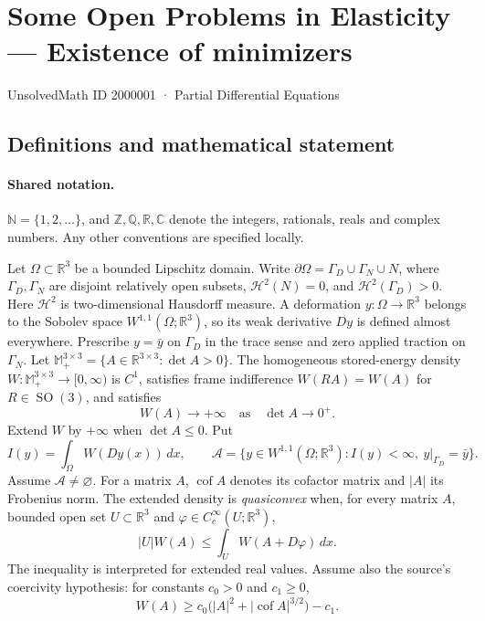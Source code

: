 \documentclass[11pt]{book}
\begin{document}
\setcounter{section}{2000000}
\section{Some Open Problems in Elasticity — Existence of minimizers}\label{2000001}
{\small\sffamily UnsolvedMath ID 2000001 · Partial Differential Equations}
\subsection{Definitions and mathematical statement}

\paragraph{Shared notation.}$\mathbb N=\{1,2,\ldots\}$, and $\mathbb Z,\mathbb Q,\mathbb R,\mathbb C$ denote the integers, rationals, reals and complex numbers. Any other conventions are specified locally.


Let $\Omega\subset\mathbb R^3$ be a bounded Lipschitz domain. Write $\partial\Omega=\Gamma_D\cup\Gamma_N\cup N$, where $\Gamma_D,\Gamma_N$ are disjoint relatively open subsets, $\mathcal H^2(N)=0$, and $\mathcal H^2(\Gamma_D)>0$. Here $\mathcal H^2$ is two-dimensional Hausdorff measure. A deformation $y:\Omega\to\mathbb R^3$ belongs to the Sobolev space $W^{1,1}(\Omega;\mathbb R^3)$, so its weak derivative $Dy$ is defined almost everywhere. Prescribe $y=\bar y$ on $\Gamma_D$ in the trace sense and zero applied traction on $\Gamma_N$.
Let $\mathbb M_+^{3\times3}=\{A\in\mathbb R^{3\times3}:\det A>0\}$. The homogeneous stored-energy density $W:\mathbb M_+^{3\times3}\to[0,\infty)$ is $C^1$, satisfies frame indifference $W(RA)=W(A)$ for $R\in\operatorname{SO}(3)$, and satisfies
\[
 W(A)\longrightarrow+\infty\quad\text{as}\quad\det A\longrightarrow0^+.
\]
Extend $W$ by $+\infty$ when $\det A\le0$. Put
\[
 I(y)=\int_\Omega W(Dy(x))\,dx,\qquad
 \mathcal A=\{y\in W^{1,1}(\Omega;\mathbb R^3):I(y)<\infty,\ y|_{\Gamma_D}=\bar y\}.
\]
Assume $\mathcal A\ne\varnothing$. For a matrix $A$, $\operatorname{cof}A$ denotes its cofactor matrix and $|A|$ its Frobenius norm.
The extended density is \emph{quasiconvex} when, for every matrix $A$, bounded open set $U\subset\mathbb R^3$ and $\varphi\in C_c^\infty(U;\mathbb R^3)$,
\[
 |U|W(A)\le\int_U W(A+D\varphi)\,dx.
\]
The inequality is interpreted for extended real values. Assume also the source's coercivity hypothesis: for constants $c_0>0$ and $c_1\ge0$,
\[
 W(A)\ge c_0\bigl(|A|^2+|\operatorname{cof}A|^{3/2}\bigr)-c_1.
\]
\end{document}
